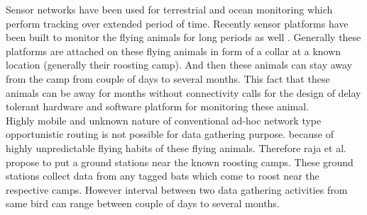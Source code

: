 \documentclass[conference]{IEEEtran}
\begin{document}
Sensor networks have been used for terrestrial \cite{robo-mote} and ocean monitoring \cite{Vasilescu05krill:an} which perform tracking over extended period of time. Recently sensor platforms have been built to monitor the flying animals for long periods as well \cite{Anthony:2012:STC:2185677.2185747} \cite{raja-ipsn}. Generally these platforms are attached on these flying animals in form of a collar at a known location (generally their roosting camp). And then these animals can stay away from the camp from couple of days to several months. This fact that these animals can be away for months without connectivity calls for the design of delay tolerant hardware and software platform for monitoring these animal. \\
Highly mobile and unknown nature of conventional ad-hoc network type opportunistic routing is not possible for data gathering purpose.  because of highly unpredictable flying habits of these flying animals. Therefore raja et al.\cite{raja-ipsn} propose to put a ground stations near the known roosting camps. These ground stations collect data from any tagged bats which come to roost near the respective camps. However interval between two data gathering activities from same bird can range between couple of days to several months. \\ %
\end{document}
